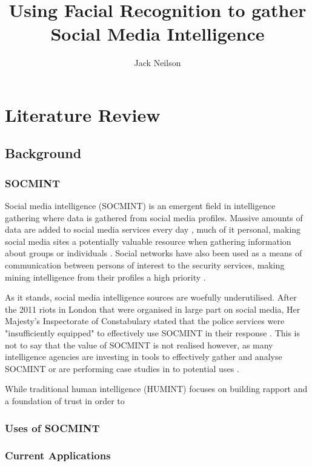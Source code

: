 \documentclass{article}
\begin{document}
\title{Using Facial Recognition to gather Social Media Intelligence}
\author{Jack Neilson}
\maketitle
\newpage
\section{Literature Review}
\subsection{Background}
\subsubsection{SOCMINT}
Social media intelligence (SOCMINT) is an emergent field in intelligence gathering where data is gathered from social media profiles. Massive amounts of data are added to social media services every day \citep{socmintoverview}, much of it personal, making social media sites a potentially valuable resource when gathering information about groups or individuals \citep{gchqmasssurveillance}. Social networks have also been used as a means of communication between persons of interest to the security services, making mining intelligence from their profiles a high priority \citep{socmintoverview}\citep{policesocmint}.

As it stands, social media intelligence sources are woefully underutilised. After the 2011 riots in London that were organised in large part on social media, Her Majesty's Inspectorate of Constabulary stated that the police services were "insufficiently equipped" to effectively use SOCMINT in their response \citep{socmintpublicsafety}. This is not to say that the value of SOCMINT is not realised however, as many intelligence agencies are investing in tools to effectively gather and analyse SOCMINT \citep{socmintpublicsafety} or are performing case studies in to potential uses \citep{bostonbombingcasestudy}.

While traditional human intelligence (HUMINT) focuses on building rapport and a foundation of trust in order to 

\subsubsection{Uses of SOCMINT}

\subsubsection{Current Applications}
\end{document}
